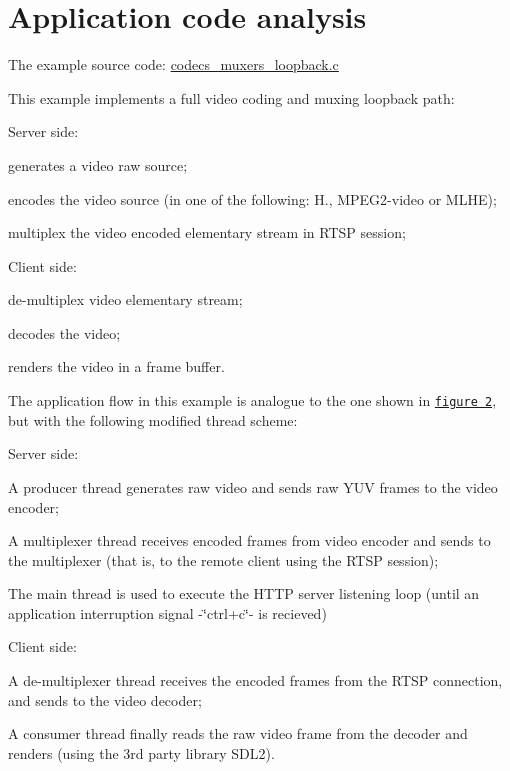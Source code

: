 \section*{Application code analysis }

The example source code\+: \hyperlink{codecs__muxers__loopback_8c}{codecs\+\_\+muxers\+\_\+loopback.\+c}

This example implements a full video coding and muxing loopback path\+:
\begin{DoxyItemize}
\item Server side\+:
\begin{DoxyItemize}
\item generates a video raw source;
\item encodes the video source (in one of the following\+: H., M\+P\+E\+G2-\/video or M\+L\+HE);
\item multiplex the video encoded elementary stream in R\+T\+SP session;
\end{DoxyItemize}
\item Client side\+:
\begin{DoxyItemize}
\item de-\/multiplex video elementary stream;
\item decodes the video;
\item renders the video in a frame buffer.
\end{DoxyItemize}
\end{DoxyItemize}

The application flow in this example is analogue to the one shown in \href{md_DOCUMENTATION.html#How_to_use_a_Processor_the_API}{\tt figure 2}, but with the following modified thread scheme\+:
\begin{DoxyItemize}
\item Server side\+:
\begin{DoxyItemize}
\item A \textquotesingle{}producer thread\textquotesingle{} generates raw video and sends raw Y\+UV frames to the video encoder;
\item A \textquotesingle{}multiplexer thread\textquotesingle{} receives encoded frames from video encoder and sends to the multiplexer (that is, to the remote client using the R\+T\+SP session);
\item The main thread is used to execute the H\+T\+TP server listening loop (until an application interruption signal -\/\char`\"{}ctrl+c\char`\"{}-\/ is recieved)
\end{DoxyItemize}
\item Client side\+:
\begin{DoxyItemize}
\item A \textquotesingle{}de-\/multiplexer thread\textquotesingle{} receives the encoded frames from the R\+T\+SP connection, and sends to the video decoder;
\item A \textquotesingle{}consumer thread\textquotesingle{} finally reads the raw video frame from the decoder and renders (using the 3rd party library S\+D\+L2).
\end{DoxyItemize}
\end{DoxyItemize}

